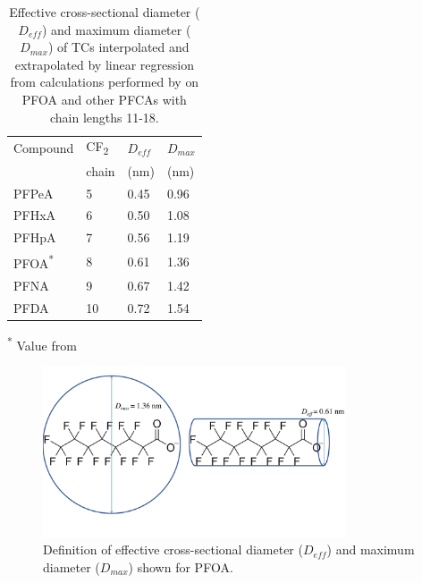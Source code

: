 \begin{table}
\caption{Effective cross-sectional diameter ($D_{eff}$) and maximum diameter ($D_{max}$) of TCs interpolated and extrapolated by linear regression from calculations performed by \cite{inoue2012size} on PFOA and other PFCAs with chain lengths 11-18.}
\centering
\begin{threeparttable}
\label{tab:molecsize}
\begin{tabular}{llll}
\toprule
Compound & CF\textsubscript{2} & $D_{eff}$ & $D_{max}$ \\ 
& chain & (nm) & (nm) \\ \midrule
PFPeA & 5  & 0.45  & 0.96  \\
PFHxA & 6  & 0.50  & 1.08  \\
PFHpA & 7  & 0.56  & 1.19  \\
PFOA\textsuperscript{*} & 8 & 0.61 & 1.36 \\
PFNA & 9 & 0.67 & 1.42  \\
PFDA & 10 & 0.72 & 1.54  \\ \bottomrule                                    
\end{tabular}
\begin{tablenotes}
\item \textsuperscript{*} Value from \cite{inoue2012size}
\end{tablenotes}
\end{threeparttable}
\end{table}

\begin{figure}
    \centering
    \includegraphics[width=0.8\textwidth, trim={0 2cm 0 0},clip]{Diagrams/Molecular_size.pdf}
    \caption{Definition of effective cross-sectional diameter ($D_{eff}$) and maximum diameter ($D_{max}$) shown for PFOA.}
    \label{fig:molecularSize}
\end{figure}

